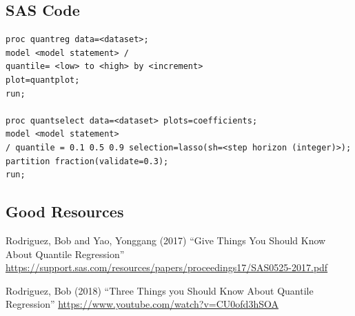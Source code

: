 \documentclass[12pt]{notes}
\begin{document}
\subsection{SAS Code}
\begin{verbatim}
proc quantreg data=<dataset>;
model <model statement> /
quantile= <low> to <high> by <increment>
plot=quantplot;
run;

proc quantselect data=<dataset> plots=coefficients;
model <model statement>
/ quantile = 0.1 0.5 0.9 selection=lasso(sh=<step horizon (integer)>);
partition fraction(validate=0.3);
run;
\end{verbatim}








\subsection{Good Resources}
\bi
\item Rodriguez, Bob and Yao, Yonggang (2017) “Give Things You Should Know About Quantile Regression” \url{https://support.sas.com/resources/papers/proceedings17/SAS0525-2017.pdf} 
\item Rodriguez, Bob (2018) “Three Things you Should Know About Quantile Regression” \url{https://www.youtube.com/watch?v=CU0ofd3hSOA} 
\ei
\end{document}
